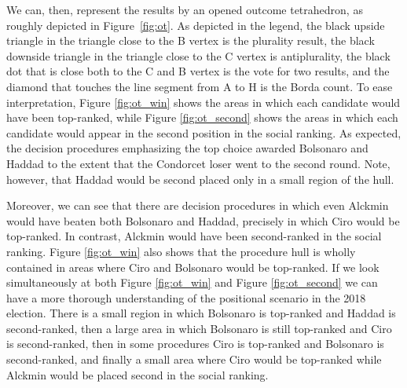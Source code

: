 \documentclass[hidelinks,11pt]{article} \usepackage[utf8]{inputenc}
\begin{document}
We can, then, represent the results by an opened outcome tetrahedron, as roughly depicted in Figure~\ref{fig:ot}. As depicted in the legend, the black upside triangle in the triangle close to the B vertex is the plurality result, the black downside triangle in the triangle close to the C vertex is antiplurality, the black dot that is close both to the C and B vertex is the vote for two results, and the diamond that touches the line segment from A to H is the Borda count. To ease interpretation, Figure \ref{fig:ot_win} shows the areas in which each candidate would have been top-ranked, while Figure \ref{fig:ot_second} shows the areas in which each candidate would appear in the second position in the social ranking. As expected, the decision procedures emphasizing the top choice awarded Bolsonaro and Haddad to the extent that the Condorcet loser went to the second round. Note, however, that Haddad would be second placed only in a small region of the hull.

Moreover, we can see that there are decision procedures in which even Alckmin would have beaten both Bolsonaro and Haddad, precisely in which Ciro would be top-ranked. In contrast, Alckmin would have been second-ranked in the social ranking. Figure \ref{fig:ot_win} also shows that the procedure hull is wholly contained in areas where Ciro and Bolsonaro would be top-ranked. If we look simultaneously at both Figure \ref{fig:ot_win} and Figure \ref{fig:ot_second} we can have a more thorough understanding of the positional scenario in the 2018 election. There is a small region in which Bolsonaro is top-ranked and Haddad is second-ranked, then a large area in which Bolsonaro is still top-ranked and Ciro is second-ranked, then in some procedures Ciro is top-ranked and Bolsonaro is second-ranked, and finally a small area where Ciro would be top-ranked while Alckmin would be placed second in the social ranking.

\end{document}
